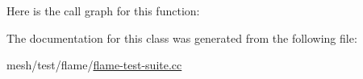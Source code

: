 Here is the call graph for this function\+:




The documentation for this class was generated from the following file\+:\begin{DoxyCompactItemize}
\item 
mesh/test/flame/\hyperlink{flame-test-suite_8cc}{flame-\/test-\/suite.\+cc}\end{DoxyCompactItemize}

